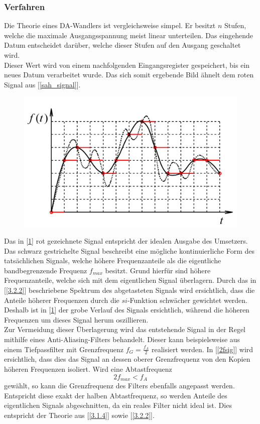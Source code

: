 \subsubsection{Verfahren}
Die Theorie eines DA-Wandlers ist vergleichsweise simpel. Er besitzt $n$ Stufen, welche die maximale Ausgangsspannung meist linear unterteilen. Das eingehende Datum entscheidet darüber, welche dieser Stufen auf den Ausgang geschaltet wird.\\
Dieser Wert wird von einem nachfolgenden Eingangsregister gespeichert, bis ein neues Datum verarbeitet wurde. Das sich somit ergebende Bild ähnelt dem roten Signal aus [\ref{sah_signal}].

\begin{figure}[h!]
\centering
\includegraphics[scale=0.3]{images/dau_t.png}
\label{dau_signal}
\end{figure}

Das in [\ref{dau_signal}] rot gezeichnete Signal entspricht der idealen Ausgabe des Umsetzers. Das schwarz gestrichelte Signal beschreibt eine mögliche kontinuierliche Form des tatsächlichen Signals, welche höhere Frequenzanteile als die eigentliche bandbegrenzende Frequenz $f_{max}$ besitzt. Grund hierfür sind höhere Frequenzanteile, welche sich mit dem eigentlichen Signal überlagern. Durch das in [\ref{3.2.2}] beschriebene Spektrum des abgetasteten Signals wird ersichtlich, dass die Anteile höherer Frequenzen durch die $si$-Funktion schwächer gewichtet werden. Deshalb ist in [\ref{dau_signal}] der grobe Verlauf des Signals ersichtlich, während die höheren Frequenzen um dieses Signal herum oszillieren.\\

Zur Vermeidung dieser Überlagerung wird das entstehende Signal in der Regel mithilfe eines Anti-Aliasing-Filters behandelt. Dieser kann beispielsweise aus einem Tiefpassfilter mit Grenzfrequenz $f_G =\frac{f_A}{2}$ realisiert werden. In [\ref{2fsig}] wird ersichtlich, dass dies das Signal an dessen oberer Grenzfrequenz von den Kopien höheren Frequenzen isoliert. Wird eine Abtastfrequenz $$2f_{max} < f_A $$ gewählt, so kann die Grenzfrequenz des Filters ebenfalls angepasst werden. Entspricht diese exakt der halben Abtastfrequenz, so werden Anteile des eigentlichen Signals abgeschnitten, da ein reales Filter nicht ideal ist. Dies entspricht der Theorie aus [\ref{3.1.4}] sowie [\ref{3.2.2}].

